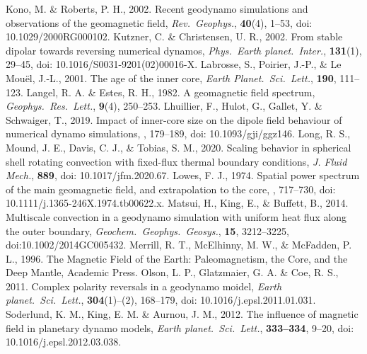 \begin{thebibliography}{}
%
Kono, M. \& Roberts, P. H., 2002. Recent geodynamo simulations and observations of the geomagnetic field, {\it Rev.\ Geophys.}, {\bf 40}(4), 1--53, doi: 10.1029/2000RG000102.
%
Kutzner, C. \& Christensen, U. R., 2002. From stable dipolar towards reversing numerical dynamos, {\it Phys.\ Earth planet.\ Inter.}, {\bf 131}(1), 29--45, doi: 10.1016/S0031-9201(02)00016-X.
%
Labrosse, S., Poirier, J.-P., \& Le Mou{\"e}l, J.-L., 2001. The age of the inner core, {\it Earth Planet.\ Sci.\ Lett.}, {\bf 190}, 111--123.
%
Langel, R. A. \& Estes, R. H., 1982. A geomagnetic field spectrum, {\it Geophys.\ Res.\ Lett.}, {\bf 9}(4), 250--253.
%
Lhuillier, F., Hulot, G., Gallet, Y. \& Schwaiger, T., 2019. Impact of inner-core size on the dipole field behaviour of numerical dynamo simulations, , 179--189, doi: 10.1093/gji/ggz146.
%
Long, R. S., Mound, J. E., Davis, C. J., \& Tobias, S. M., 2020. Scaling behavior in spherical shell rotating convection with fixed-flux thermal boundary conditions, {\it J. Fluid Mech.}, {\bf 889}, doi: 10.1017/jfm.2020.67.
%
Lowes, F. J., 1974. Spatial power spectrum of the main geomagnetic field, and extrapolation to the core, , 717--730, doi: 10.1111/j.1365-246X.1974.tb00622.x.
%
Matsui, H., King, E., \& Buffett, B., 2014. Multiscale convection in a geodynamo simulation with uniform heat flux along the outer boundary, {\it Geochem.\ Geophys.\ Geosys.}, {\bf 15},  3212--3225, doi:10.1002/2014GC005432.
%
Merrill, R. T., McElhinny, M. W., \& McFadden, P. L., 1996. The Magnetic Field of the Earth: Paleomagnetism, the Core, and the Deep Mantle, Academic Press.
%
Olson, L. P., Glatzmaier, G. A. \& Coe, R. S., 2011. Complex polarity reversals in a geodynamo moidel, {\it Earth planet.\ Sci.\ Lett.}, {\bf 304}(1)--(2), 168--179, doi: 10.1016/j.epsl.2011.01.031.
%
Soderlund, K. M., King, E. M. \& Aurnou, J. M., 2012. The influence of magnetic field in planetary dynamo models, {\it Earth planet.\ Sci.\ Lett.}, {\bf 333--334}, 9--20, doi: 10.1016/j.epsl.2012.03.038.

\end{thebibliography}
